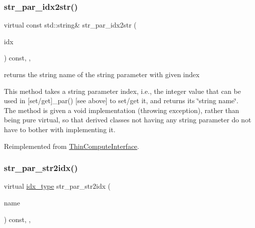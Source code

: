 \subsubsection{\texorpdfstring{str\+\_\+par\+\_\+idx2str()}{str\_par\_idx2str()}}
{\footnotesize\ttfamily virtual const std\+::string\& str\+\_\+par\+\_\+idx2str (\begin{DoxyParamCaption}\item[{const \mbox{\hyperlink{class_s_m_spp__di__unipi__it_1_1_thin_compute_interface_aa3d710629ad8c434286726ad810c3b47}{idx\+\_\+type}}}]{idx }\end{DoxyParamCaption}) const\hspace{0.3cm}{\ttfamily [inline]}, {\ttfamily [override]}, {\ttfamily [virtual]}}



returns the string name of the string parameter with given index 

This method takes a string parameter index, i.\+e., the integer value that can be used in \mbox{[}set/get\mbox{]}\+\_\+par() \mbox{[}see above\mbox{]} to set/get it, and returns its \char`\"{}string name\char`\"{}. The method is given a void implementation (throwing exception), rather than being pure virtual, so that derived classes not having any string parameter do not have to bother with implementing it. 

Reimplemented from \mbox{\hyperlink{class_s_m_spp__di__unipi__it_1_1_thin_compute_interface_ad886220da008681ec350ce43aac421ee}{Thin\+Compute\+Interface}}.

\mbox{\label{class_s_m_spp__di__unipi__it_1_1_f_real_objective_a0ddaa949b3db7b6adeb4ed8d623637ca}} 
\subsubsection{\texorpdfstring{str\+\_\+par\+\_\+str2idx()}{str\_par\_str2idx()}}
{\footnotesize\ttfamily virtual \mbox{\hyperlink{class_s_m_spp__di__unipi__it_1_1_thin_compute_interface_aa3d710629ad8c434286726ad810c3b47}{idx\+\_\+type}} str\+\_\+par\+\_\+str2idx (\begin{DoxyParamCaption}\item[{const std\+::string \&}]{name }\end{DoxyParamCaption}) const\hspace{0.3cm}{\ttfamily [inline]}, {\ttfamily [override]}, {\ttfamily [virtual]}}



